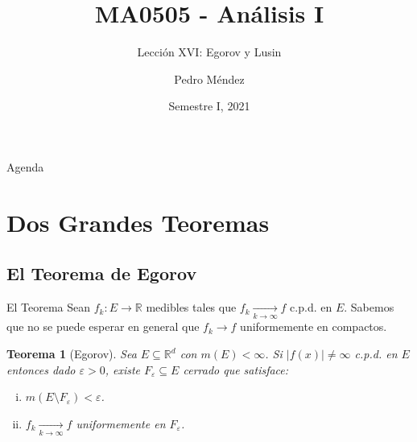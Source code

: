 \documentclass[utf8]{beamer}
\title[MA0505]{MA0505 - An\'alisis I}
\subtitle{Lecci\'on XVI: Egorov y Lusin}
\author{Pedro M\'endez\inst{1}}
\institute[Universidad de Costa Rica] %
{
  \inst{1}%
  Departmento de Matem\'atica Pura y Ciencias Actuariales\\
  Universidad de Costa Rica
  }
\date[I-2021] {Semestre I, 2021}
\theoremstyle{plain}
\newtheorem{Th}{Teorema}               %
\theoremstyle{definition}
\theoremstyle{remark}
\numberwithin{equation}{section}
\newcommand{\eps}{\varepsilon}          %
\newcommand{\bR}{\mathbb{R}}    %
\newcommand{\less}{\setminus}           %
\renewcommand{\.}{\Cdot}                %
\begin{document}
\begin{frame}
  \titlepage
\end{frame}

\begin{frame}{Agenda}
  \tableofcontents
\end{frame}





\section{Dos Grandes Teoremas}

\subsection{El Teorema de Egorov}

\begin{frame}{El Teorema}
  Sean $f_k:E\to\bR$ medibles tales que $f_k\xrightarrow[k\to\infty]{}f$ c.p.d. en $E$. Sabemos que no se puede esperar en general que $f_k\to f$ uniformemente en compactos.
  \begin{Th}[Egorov]\label{th:Egorov}
    Sea $E\subseteq\bR^d$ con $m(E)<\infty$. Si $|f(x)|\neq\infty$ c.p.d. en $E$ entonces dado $\eps>0$, existe $F_\eps\subseteq E$ cerrado que satisface:
    \begin{enumerate}[(i)]
      \item $m(E\less F_\eps)<\eps$.
      \item $f_k\xrightarrow[k\to\infty]{} f$ uniformemente en $F_\eps$.
    \end{enumerate}
  \end{Th}
\end{frame}
\end{document}
